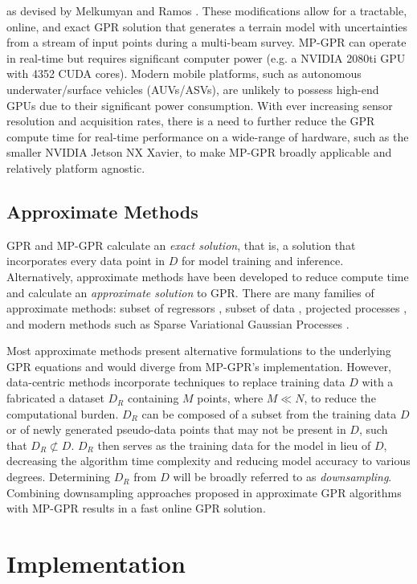 as devised by Melkumyan and Ramos \cite{melkumyan2009sparse}. These modifications allow for a tractable, online, and exact GPR solution that generates a terrain model with uncertainties from a stream of input points during a multi-beam survey. MP-GPR can operate in real-time but requires significant computer power (e.g. a NVIDIA 2080ti GPU with 4352 CUDA cores). Modern mobile platforms, such as autonomous underwater/surface vehicles (AUVs/ASVs), are unlikely to possess high-end GPUs due to their significant power consumption. With ever increasing sensor resolution and acquisition rates, there is a need to further reduce the GPR compute time for real-time performance on a wide-range of hardware, such as the smaller NVIDIA Jetson NX Xavier, to make MP-GPR broadly applicable and relatively platform agnostic. 

\subsection{Approximate Methods}

GPR and MP-GPR calculate an \textit{exact solution}, that is, a solution that incorporates every data point in $D$ for model training and inference. Alternatively, approximate methods have been developed to reduce compute time and calculate an \textit{approximate solution} to GPR. There are many families of approximate methods: subset of regressors \cite{Silverman1985}, subset of data \cite{Lawrence2002}, projected processes \cite{Seeger2003}, and modern methods such as Sparse Variational Gaussian Processes \cite{Titsias2009}.

Most approximate methods present alternative formulations to the underlying GPR equations and would diverge from MP-GPR's implementation. However, data-centric methods incorporate techniques to replace training data $D$ with a fabricated a dataset $D_R$ containing $M$ points, where $M \ll N$, to reduce the computational burden. $D_R$ can be composed of a subset from the training data $D$ or of newly generated pseudo-data points that may not be present in $D$, such that $D_R \not\subset D$. $D_R$ then serves as the training data for the model in lieu of $D$, decreasing the algorithm time complexity and reducing model accuracy to various degrees. Determining $D_R$ from $D$ will be broadly referred to as \textit{downsampling}. Combining downsampling approaches proposed in approximate GPR algorithms with MP-GPR results in a fast online GPR solution.

\section{Implementation}\label{sec:implementation}

